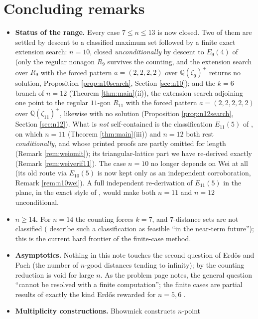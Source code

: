 \documentclass[11pt]{article}
\theoremstyle{definition}
\theoremstyle{remark}
\newcommand{\Q}{\mathbb{Q}}
\begin{document}
\section{Concluding remarks}\label{sec:remarks}

\begin{itemize}
\item \textbf{Status of the range.} Every case $7 \le n \le 13$ is now closed. Two of them
are settled by descent to a classified maximum set followed by a finite exact extension
search: $n = 10$, closed \emph{unconditionally} by descent to $E_9(4)$ of \cite{ErFi96}
(only the regular nonagon $R_9$ survives the counting, and the extension search over $R_9$
with the forced pattern $a = (2,2,2,2)$ over $\Q(\zeta_9)^+$ returns no solution,
Proposition \ref{prop:n10search}, Section \ref{sec:n10}); and the $k = 6$ branch of
$n = 12$ (Theorem \ref{thm:main}(ii)), the extension search adjoining one point to the
regular $11$-gon $R_{11}$ with the forced pattern $a = (2,2,2,2,2)$ over $\Q(\zeta_{11})^+$,
likewise with no solution (Proposition \ref{prop:n12search}, Section \ref{sec:n12}). What
is \emph{not} self-contained is the classification $E_{11}(5)$ of \cite{Wei11}, on which
$n = 11$ (Theorem \ref{thm:main}(iii)) and $n = 12$ both rest \emph{conditionally}, and
whose printed proofs are partly omitted for length (Remark \ref{rem:weiomit}); its
triangular-lattice part we have re-derived exactly (Remark \ref{rem:weiverif11}). The case
$n = 10$ no longer depends on Wei at all (its old route via $E_{10}(5)$ \cite{Wei12} is now
kept only as an independent corroboration, Remark \ref{rem:n10wei}). A full independent
re-derivation of $E_{11}(5)$ in the plane, in the exact style of \cite{SzOs20}, would make
both $n = 11$ and $n = 12$ unconditional.
\item \textbf{$n \ge 14$.} For $n = 14$ the counting forces $k = 7$, and $7$-distance
sets are not classified (\cite{SzOs20} describe such a classification as feasible ``in
the near-term future''); this is the current hard frontier of the finite-case method.
\item \textbf{Asymptotics.} Nothing in this note touches the second question of Erd\H{o}s
and Pach (the number of $n$-good distances tending to infinity); by \cite{GuthKatz15} the
counting reduction is void for large $n$. As the problem page notes, the general question
``cannot be resolved with a finite computation''; the finite cases are partial results of
exactly the kind Erd\H{o}s rewarded for $n = 5, 6$ \cite{ErFi95}.
\item \textbf{Multiplicity constructions.} Bhowmick \cite{Bhowmick24} constructs $n$-point

\end{itemize}
\end{document}
